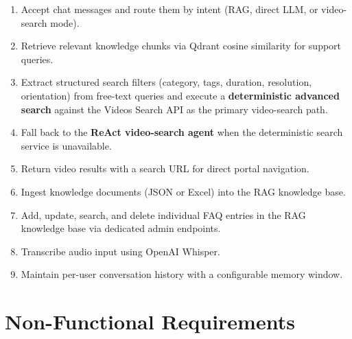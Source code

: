 \begin{enumerate}[label=\textbf{FR-AH-\arabic*}]
  \item Accept chat messages and route them by intent (RAG, direct LLM, or video-search mode).
  \item Retrieve relevant knowledge chunks via Qdrant cosine similarity for support queries.
  \item Extract structured search filters (category, tags, duration, resolution, orientation)
    from free-text queries and execute a \textbf{deterministic advanced search} against the
    Videos Search API as the primary video-search path.
  \item Fall back to the \textbf{ReAct video-search agent} when the deterministic
    search service is unavailable.
  \item Return video results with a search URL for direct portal navigation.
  \item Ingest knowledge documents (JSON or Excel) into the RAG knowledge base.
  \item Add, update, search, and delete individual FAQ entries in the RAG knowledge base via
    dedicated admin endpoints.
  \item Transcribe audio input using OpenAI Whisper.
  \item Maintain per-user conversation history with a configurable memory window.
\end{enumerate}

\section{Non-Functional Requirements}

